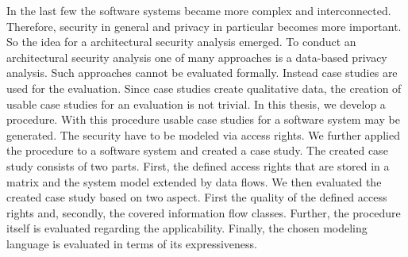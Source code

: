 
\Abstract
In the last few the software systems became more complex and interconnected. Therefore, security in general and privacy in particular becomes more important. So the idea for a architectural security analysis emerged. To conduct an architectural security analysis one of many approaches is a data-based privacy analysis. Such approaches cannot be evaluated formally. Instead case studies are used for the evaluation. Since case studies create qualitative data, the creation of usable case studies for an evaluation is not trivial. In this thesis, we develop a procedure. With this procedure usable case studies for a software system may be generated. The security have to be modeled via access rights. We further applied the procedure to a software system and created a case study. The created case study consists of two parts. First, the defined access rights that are stored in a matrix and the system model extended by data flows. We then evaluated the created case study based on two aspect. First the quality of the defined access rights and, secondly, the covered information flow classes. Further, the procedure itself is evaluated regarding the applicability. Finally, the chosen modeling language is evaluated in terms of its expressiveness.